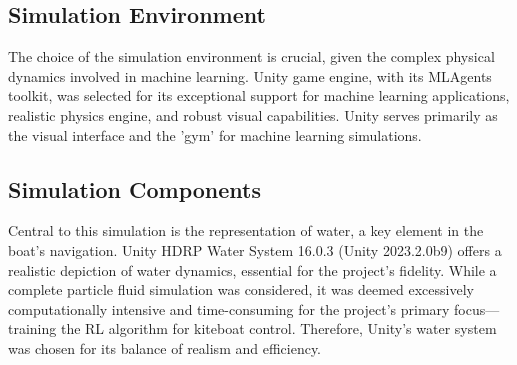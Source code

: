 \subsection{Simulation Environment}
The choice of the simulation environment is crucial, given the complex physical dynamics involved in machine learning. Unity game engine, with its MLAgents toolkit, was selected for its exceptional support for machine learning applications, realistic physics engine, and robust visual capabilities. Unity serves primarily as the visual interface and the 'gym' for machine learning simulations.

\subsection{Simulation Components}
Central to this simulation is the representation of water, a key element in the boat's navigation. Unity HDRP Water System 16.0.3 (Unity 2023.2.0b9) offers a realistic depiction of water dynamics, essential for the project's fidelity. While a complete particle fluid simulation was considered, it was deemed excessively computationally intensive and time-consuming for the project's primary focus—training the RL algorithm for kiteboat control. Therefore, Unity's water system was chosen for its balance of realism and efficiency.








